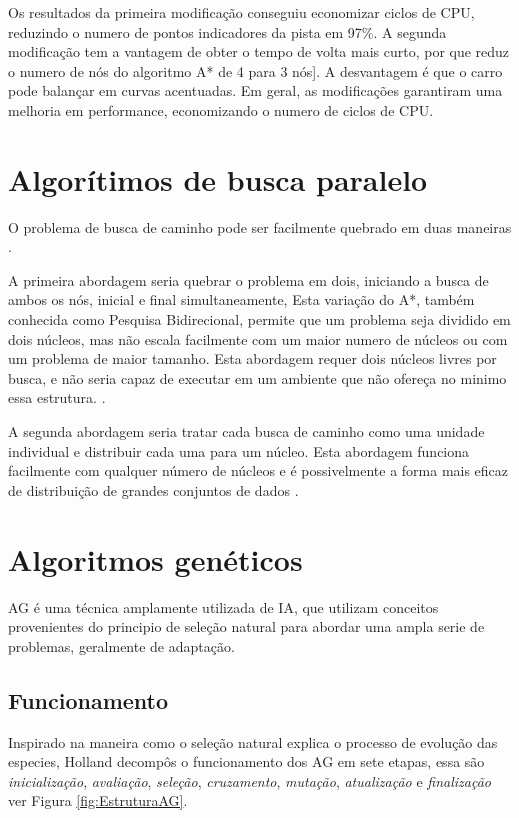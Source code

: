 Os resultados da primeira modificação conseguiu economizar ciclos de CPU, reduzindo o numero de pontos indicadores da pista em 97\%. A segunda modificação tem a vantagem de obter o tempo de volta mais curto, por que reduz o numero de nós do algoritmo A* de 4 para 3 nós]. A desvantagem é que o carro pode balançar em curvas acentuadas. Em geral, as modificações garantiram uma melhoria em performance, economizando o numero de ciclos de CPU.


\section{Algorítimos de busca paralelo}

O problema de busca de caminho pode ser facilmente quebrado em duas maneiras \cite{WilliamMiller}.

A primeira abordagem seria quebrar o problema em dois, iniciando a busca  de ambos os nós, inicial e final simultaneamente, Esta variação do A*, também conhecida como Pesquisa Bidirecional, permite que um problema seja dividido em dois núcleos, mas não escala facilmente com um maior numero de núcleos ou com um problema de maior tamanho. Esta abordagem requer dois núcleos livres por busca, e não seria capaz de executar em um ambiente que não ofereça no minimo essa estrutura. \cite{Janie_Chang}.

A segunda abordagem seria tratar cada busca de caminho como uma unidade individual e distribuir cada uma para um núcleo.
Esta abordagem funciona facilmente com qualquer número de núcleos e é possivelmente a forma mais eficaz de distribuição de grandes conjuntos de dados \cite{Jad} \cite{WilliamMiller}.


\section{Algoritmos genéticos}

AG é uma técnica amplamente utilizada de IA, que utilizam conceitos provenientes do principio de seleção natural para abordar uma  ampla serie de problemas, geralmente de adaptação.

\subsection{Funcionamento}
 
Inspirado na maneira como o seleção natural explica o processo de evolução das especies, Holland \cite{Holland1975} decompôs o funcionamento dos AG em sete etapas, essa são \textit{inicialização}, \textit{avaliação}, \textit{seleção}, \textit{cruzamento}, \textit{mutação}, \textit{atualização} e  \textit{finalização} ver Figura \ref{fig:EstruturaAG}. \cite{DiogoCLucas}

